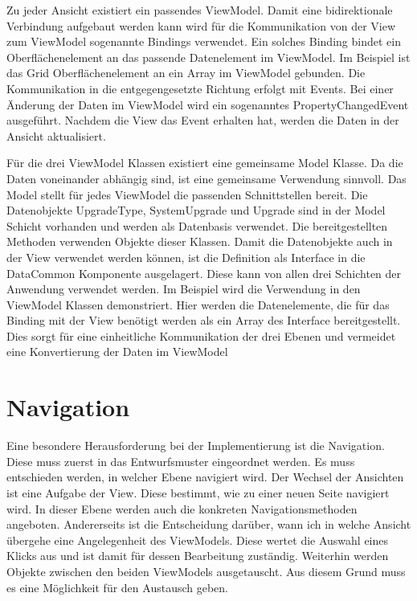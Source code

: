 Zu jeder Ansicht existiert ein passendes ViewModel. Damit eine bidirektionale Verbindung aufgebaut werden kann wird für die Kommunikation von der View zum ViewModel sogenannte Bindings verwendet. Ein solches Binding bindet ein Oberflächenelement an das passende Datenelement im ViewModel. Im Beispiel ist das Grid Oberflächenelement an ein Array im ViewModel gebunden. Die Kommunikation in die entgegengesetzte Richtung erfolgt mit Events. Bei einer Änderung der Daten im ViewModel wird ein sogenanntes PropertyChangedEvent ausgeführt. Nachdem die View das Event erhalten hat, werden die Daten in der Ansicht aktualisiert. \par

Für die drei ViewModel Klassen existiert eine gemeinsame Model Klasse. Da die Daten voneinander abhängig sind, ist eine gemeinsame Verwendung sinnvoll. Das Model stellt für jedes ViewModel die passenden Schnittstellen bereit. Die Datenobjekte UpgradeType, SystemUpgrade und Upgrade sind in der Model Schicht vorhanden und werden als Datenbasis verwendet. Die bereitgestellten Methoden verwenden Objekte dieser Klassen. Damit die Datenobjekte auch in der View verwendet werden können, ist die Definition als Interface in die DataCommon Komponente ausgelagert. Diese kann von allen drei Schichten der Anwendung verwendet werden. Im Beispiel wird die Verwendung in den ViewModel Klassen demonstriert. Hier werden die Datenelemente, die für das Binding mit der View benötigt werden als ein Array des Interface bereitgestellt. Dies sorgt für eine einheitliche Kommunikation der drei Ebenen und vermeidet eine Konvertierung der Daten im ViewModel


\section{Navigation}
Eine besondere Herausforderung bei der Implementierung ist die Navigation. Diese muss zuerst in das Entwurfsmuster eingeordnet werden. Es muss entschieden werden, in welcher Ebene navigiert wird. Der Wechsel der Ansichten ist eine Aufgabe der View. Diese bestimmt, wie zu einer neuen Seite navigiert wird. In dieser Ebene werden auch die konkreten Navigationsmethoden angeboten. Andererseits ist die Entscheidung darüber, wann ich in welche Ansicht übergehe eine Angelegenheit des ViewModels. Diese wertet die Auswahl eines Klicks aus und ist damit für dessen Bearbeitung zuständig. Weiterhin werden Objekte zwischen den beiden ViewModels ausgetauscht. Aus diesem Grund muss es eine Möglichkeit für den Austausch geben. \par 

